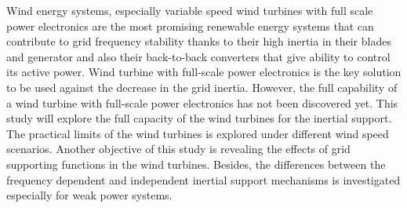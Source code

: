 Wind energy systems, especially variable speed wind turbines with full scale power electronics are the most promising renewable energy systems that can contribute to grid frequency stability thanks to their high inertia in their blades and generator and also their back-to-back converters that give ability to control its active power. Wind turbine with full-scale power electronics is the key solution to be used against the decrease in the grid inertia. However, the full capability of a wind turbine with full-scale power electronics has not been discovered yet. This study will explore the full capacity of the wind turbines for the inertial support. The practical limits of the wind turbines is explored under different wind speed scenarios. Another objective of this study is revealing the effects of grid supporting functions in the wind turbines. Besides, the differences between the frequency dependent and independent inertial support mechanisms is investigated especially for weak power systems.
